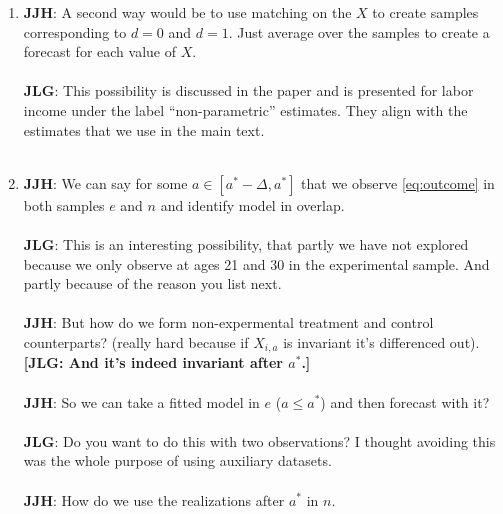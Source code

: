\begin{enumerate}
\begin{enumerate}
\item \textbf{JJH}: A second way would be to use matching on the $X$ to create samples corresponding to $d = 0$ and $d = 1$. Just average over the samples to create a forecast for each value of $X$.\\ \\
\noindent \textbf{JLG}: This possibility is discussed in the paper and is presented for labor income under the label ``non-parametric'' estimates. They align with the estimates that we use in the main text.\\ \\

\item \textbf{JJH}:  We can say for some $a \in [a^* - \Delta, a^*]$ that we observe \eqref{eq:outcome} in both samples $e$ and $n$ and identify model in overlap.\\ \\ 
\noindent \textbf{JLG}: This is an interesting possibility, that partly we have not explored because we only observe at ages 21 and 30 in the experimental sample. And partly because of the reason you list next.\\ \\

\noindent \textbf{JJH}: But how do we form non-expermental treatment and control counterparts? (really hard because if $X_{i,a}$ is invariant it's differenced out). \textbf{[JLG: And it's indeed invariant after $a^*$.]} \\ \\

\noindent \textbf{JJH}: So we can take a fitted model in $e$ ($a \leq a^*$) and then forecast with it?\\ \\ 
\noindent \textbf{JLG}: Do you want to do this with two observations? I thought avoiding this was the whole purpose of using auxiliary datasets.\\  \\
\noindent \textbf{JJH}: How do we use the realizations after $a^*$ in $n$. \\

\end{enumerate}
\end{enumerate}

\singlespace






